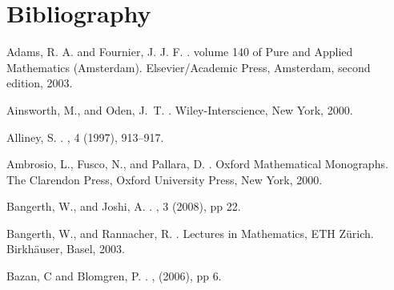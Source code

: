 \documentclass[enabledeprecatedfontcommands,cleardoublepage=empty,headsepline,twoside,11pt,DIV=15,BCOR=12mm,final]{scrartcl}
\begin{document}
\section{Bibliography}%
\makeatletter
\renewcommand{\@biblabel}[1]{[#1]}
\renewcommand*\bib@heading{%
}
\makeatother
\iffalse


\else
%
{\small
\begin{thebibliography}{99}\itemsep=-3.5pt

{\sc Adams, R. A. and Fournier, J. J. F.}
.
\newblock volume 140 of Pure and Applied Mathematics (Amsterdam). Elsevier/Academic Press, Amsterdam, second edition, 2003.

{\sc Ainsworth, M., and Oden, J.~T.}
.
\newblock Wiley-Interscience, New York, 2000.


{\sc Alliney, S.}
.
, 4 (1997), 913--917.
 
{\sc Ambrosio, L., Fusco, N., and Pallara, D.}
.
\newblock Oxford Mathematical Monographs. The Clarendon Press, Oxford University Press, New York, 2000.

{\sc Bangerth, W., and Joshi, A.}
.
, 3 (2008), pp 22.

{\sc Bangerth, W., and Rannacher, R.}
.
\newblock Lectures in Mathematics, ETH Z\"urich. Birkh\"auser, Basel, 2003.

{\sc Bazan, C and Blomgren, P.}
.
, (2006), pp 6.


\end{thebibliography}}
\end{document}
